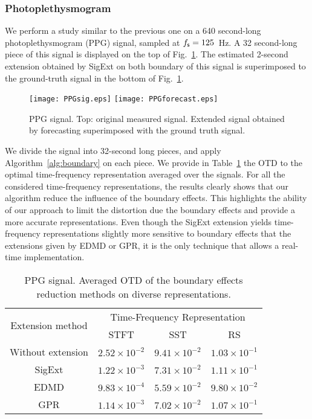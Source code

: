 \subsubsection{Photoplethysmogram}
\label{ssse:ppg}
We perform a study similar to the previous one on a 640 second-long photoplethysmogram (PPG) signal, sampled at $f_{\mathsf s}=125$~Hz. A 32 second-long piece of this signal is displayed on the top of Fig.~\ref{fig:ppg}. The estimated 2-second extension obtained by {\sf SigExt} on both boundary of this signal is superimposed to the ground-truth signal in the bottom of Fig.~\ref{fig:ppg}.

\begin{figure}
\texttt{[image: PPGsig.eps]}
\texttt{[image: PPGforecast.eps]}
\caption{PPG signal. Top: original measured signal. Extended signal obtained by forecasting superimposed with the ground truth signal.}
\label{fig:ppg}
\end{figure}

We divide the signal into 32-second long pieces, and apply Algorithm~\ref{alg:boundary} on each piece. We provide in Table~\ref{tab:otd.ppg} the OTD to the optimal time-frequency representation averaged over the signals. For all the considered time-frequency representations, the results clearly shows that our algorithm reduce the influence of the boundary effects. This highlights the ability of our approach to limit the distortion due the boundary effects and provide a more accurate representations. Even though the {\sc SigExt} extension yields time-frequency  representations slightly more sensitive to boundary effects that the extensions given by EDMD or GPR, it is the only technique that allows a real-time implementation.

\begin{table}
\centering
\caption{PPG signal. Averaged OTD of the boundary effects reduction methods on diverse representations.}
\begin{tabular}{|c||c|c|c|}
  \hline
   \multirow{2}{*}{Extension method} & \multicolumn{3}{c|}{Time-Frequency Representation} \\
   \cline{2-4}
      & STFT & SST & RS\\
   \hhline{|=#=|=|=|}
   Without extension & $2.52\times 10^{-2}$ & $9.41\times 10^{-2}$ & $1.03\times 10^{-1}$ \\
   \hline
   {\sf SigExt} & $1.22\times 10^{-3}$ & $7.31\times 10^{-2}$ & $1.11\times 10^{-1}$ \\
   \hline
   EDMD & $9.83\times 10^{-4}$ & $5.59\times 10^{-2}$ & $9.80\times 10^{-2}$ \\
   \hline
   GPR & $1.14\times 10^{-3}$ & $7.02\times 10^{-2}$ & $1.07\times 10^{-1}$ \\
   \hline
\end{tabular}
\label{tab:otd.ppg}
\end{table}


